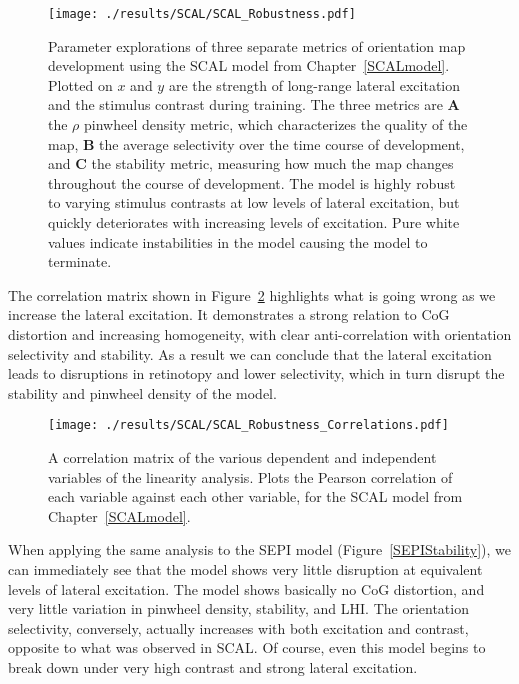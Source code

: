 \begin{figure}
	\centering
        \texttt{[image: ./results/SCAL/SCAL\_Robustness.pdf]}
	\caption{Parameter explorations of three separate metrics of
      orientation map development using the SCAL model from
      Chapter~\ref{SCALmodel}. Plotted on $x$ and $y$ are the strength
      of long-range lateral excitation and the stimulus contrast
      during training. The three metrics are \textbf{A} the $\rho$
      pinwheel density metric, which characterizes the quality of the
      map, \textbf{B} the average selectivity over the time course of
      development, and \textbf{C} the stability metric, measuring how
      much the map changes throughout the course of development. The
      model is highly robust to varying stimulus contrasts at low
      levels of lateral excitation, but quickly deteriorates with
      increasing levels of excitation. Pure white values indicate
      instabilities in the model causing the model to terminate.}
	\label{SCALStability}
\end{figure}

The correlation matrix shown in Figure~\ref{SCALRobustnessCorr}
highlights what is going wrong as we increase the lateral
excitation. It demonstrates a strong relation to CoG distortion and
increasing homogeneity, with clear anti-correlation with orientation
selectivity and stability. As a result we can conclude that the
lateral excitation leads to disruptions in retinotopy and lower
selectivity, which in turn disrupt the stability and pinwheel density
of the model.

\begin{figure}
	\centering
       \texttt{[image: ./results/SCAL/SCAL\_Robustness\_Correlations.pdf]}
	\caption{A correlation matrix of the various dependent and
      independent variables of the linearity analysis. Plots the
      Pearson correlation of each variable against each other
      variable, for the SCAL model from Chapter~\ref{SCALmodel}.}
	\label{SCALRobustnessCorr}
\end{figure}

When applying the same analysis to the SEPI model
(Figure~\ref{SEPIStability}), we can immediately see that the model
shows very little disruption at equivalent levels of lateral
excitation.  The model shows basically no CoG distortion, and very
little variation in pinwheel density, stability, and LHI. The
orientation selectivity, conversely, actually increases with both
excitation and contrast, opposite to what was observed in SCAL. Of
course, even this model begins to break down under very high contrast
and strong lateral excitation.

